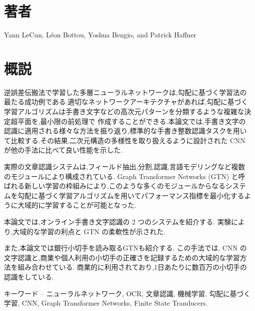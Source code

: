 \documentclass[twocolumn]{jarticle}     %
\begin{document}

\section*{著者}
Yann LeCun, L\'{e}on Bottou, Yoshua Bengio, and Patrick Haffner

\section*{概説}
逆誤差伝搬法で学習した多層ニューラルネットワークは,勾配に基づく学習法の最たる成功例である.適切なネットワークアーキテクチャがあれば,勾配に基づく学習アルゴリズムは手書き文字などの高次元パターンを分類するような複雑な決定超平面を,最小限の前処理で 作成することができる.本論文では,手書き文字の認識に適用される様々な方法を振り返り,標準的な手書き整数認識タスクを用いて比較する.その結果,二次元構造の多様性を取り扱えるように設計された CNN が他の手法に比べて良い性能を示した.
\par
実際の文章認識システムは,フィールド抽出,分割,認識,言語モデリングなど複数のモジュールにより構成されている. Graph Transformer Networks (GTN) と呼ばれる新しい学習の枠組みにより,このような多くのモジュールからなるシステムを勾配に基づく学習アルゴリズムを用いてパフォーマンス指標を最小化するように大域的に学習することが可能となった.
\par
本論文では,オンライン手書き文字認識の 2 つのシステムを紹介する.
実験により,大域的な学習の利点と GTN の柔軟性が示された.
\par
また,本論文では銀行小切手を読み取るGTNも紹介する.
この手法では, CNN の文字認識と,商業や個人利用の小切手の正確さを記録するための大域的な学習方法を組み合わせている.
商業的に利用されており,1日あたりに数百万の小切手の認識をしている.
\par
キーワード -- ニューラルネットワーク, OCR, 文章認識, 機械学習, 勾配に基づく学習, CNN, Graph Transformer Networks, Finite State Tranducers.
\end{document}
